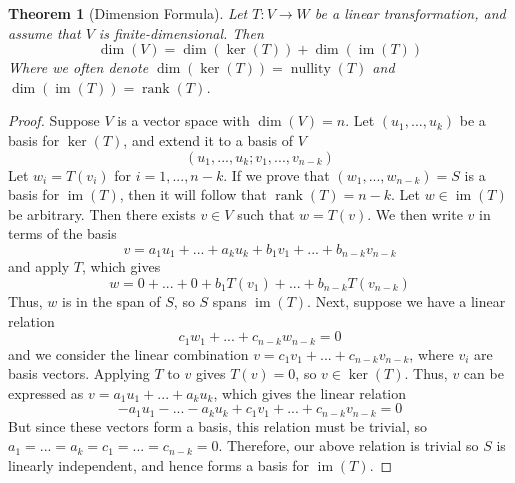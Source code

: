 \documentclass[12pt]{article}
\newtheorem{thm}{Theorem}[section]
\theoremstyle{definition}
\theoremstyle{remark}
\numberwithin{equation}{section}
\DeclareMathOperator{\im}{im}
\DeclareMathOperator{\nullity}{nullity}
\DeclareMathOperator{\rnk}{rank}
\begin{document}
\vspace{15pt}

\begin{thm}[Dimension Formula]
        Let $T:V\rightarrow W$ be a linear transformation, and assume that $V$ is finite-dimensional. Then \begin{equation}
                \dim(V) = \dim(\ker(T))+\dim(\im(T))
        \end{equation}
        Where we often denote $\dim(\ker(T)) = \nullity(T)$ and $\dim(\im(T)) = \rnk(T)$.
\end{thm}
\begin{proof}
        Suppose $V$ is a vector space with $\dim(V) = n$. Let $(u_1,...,u_k)$ be a basis for $\ker(T)$, and extend it to a basis of $V$ \begin{equation}
                (u_1,...,u_k;v_1,...,v_{n-k})
        \end{equation}
        Let $w_i = T(v_i)$ for $i = 1,...,n-k$. If we prove that $(w_1,...,w_{n-k}) = S$ is a basis for $\im(T)$, then it will follow that $\rnk(T) = n-k$. Let $w \in \im(T)$ be arbitrary. Then there exists $v \in V$ such that $w =T(v)$. We then write $v$ in terms of the basis \begin{equation}
                v = a_1u_1+...+a_ku_k+b_1v_1+...+b_{n-k}v_{n-k}
        \end{equation}
        and apply $T$, which gives \begin{equation}
                w = 0+...+0+b_1T(v_1)+...+b_{n-k}T(v_{n-k})
        \end{equation}
        Thus, $w$ is in the span of $S$, so $S$ spans $\im(T)$. Next, suppose we have a linear relation \begin{equation}
                c_1w_1+...+c_{n-k}w_{n-k} = 0
        \end{equation}
        and we consider the linear combination $v = c_1v_1+...+c_{n-k}v_{n-k}$, where $v_i$ are basis vectors. Applying $T$ to $v$ gives $T(v) = 0$, so $v \in \ker(T)$. Thus, $v$ can be expressed as $v = a_1u_1+...+a_ku_k$, which gives the linear relation \begin{equation}
                -a_1u_1-...-a_ku_k+c_1v_1+...+c_{n-k}v_{n-k} = 0
        \end{equation}
        But since these vectors form a basis, this relation must be trivial, so $a_1=...=a_k=c_1=...=c_{n-k}=0$. Therefore, our above relation is trivial so $S$ is linearly independent, and hence forms a basis for $\im(T)$.
\end{proof}
\end{document}
